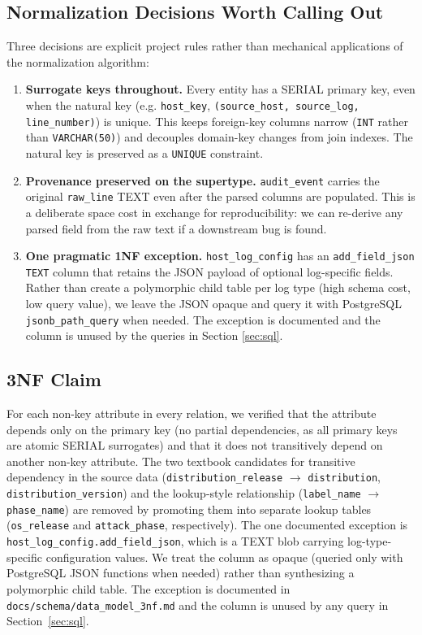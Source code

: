 \subsection{Normalization Decisions Worth Calling Out}
Three decisions are explicit project rules rather than mechanical
applications of the normalization algorithm:
\begin{enumerate}
  \item \textbf{Surrogate keys throughout.} Every entity has a SERIAL
    primary key, even when the natural key (e.g. \texttt{host\_key},
    \texttt{(source\_host, source\_log, line\_number)}) is unique. This
    keeps foreign-key columns narrow (\texttt{INT} rather than
    \texttt{VARCHAR(50)}) and decouples domain-key changes from join
    indexes. The natural key is preserved as a \texttt{UNIQUE} constraint.
  \item \textbf{Provenance preserved on the supertype.}
    \texttt{audit\_event} carries the original \texttt{raw\_line} TEXT
    even after the parsed columns are populated. This is a deliberate
    space cost in exchange for reproducibility: we can re-derive any
    parsed field from the raw text if a downstream bug is found.
  \item \textbf{One pragmatic 1NF exception.} \texttt{host\_log\_config}
    has an \texttt{add\_field\_json TEXT} column that retains the JSON
    payload of optional log-specific fields. Rather than create a
    polymorphic child table per log type (high schema cost, low query
    value), we leave the JSON opaque and query it with PostgreSQL
    \texttt{jsonb\_path\_query} when needed. The exception is documented
    and the column is unused by the queries in Section \ref{sec:sql}.
\end{enumerate}

\subsection{3NF Claim}
For each non-key attribute in every relation, we verified that the
attribute depends only on the primary key (no partial dependencies, as
all primary keys are atomic SERIAL surrogates) and that it does not
transitively depend on another non-key attribute. The two textbook
candidates for transitive dependency in the source data
(\texttt{distribution\_release} $\rightarrow$ \texttt{distribution},
\texttt{distribution\_version}) and the lookup-style relationship
(\texttt{label\_name} $\rightarrow$ \texttt{phase\_name}) are removed
by promoting them into separate lookup tables (\texttt{os\_release}
and \texttt{attack\_phase}, respectively). The one
documented exception is \texttt{host\_log\_config.add\_field\_json},
which is a TEXT blob carrying log-type-specific configuration values.
We treat the column as opaque (queried only with PostgreSQL JSON
functions when needed) rather than synthesizing a polymorphic child
table. The exception is documented in
\texttt{docs/schema/data\_model\_3nf.md} and the column is unused by
any query in Section~\ref{sec:sql}.
